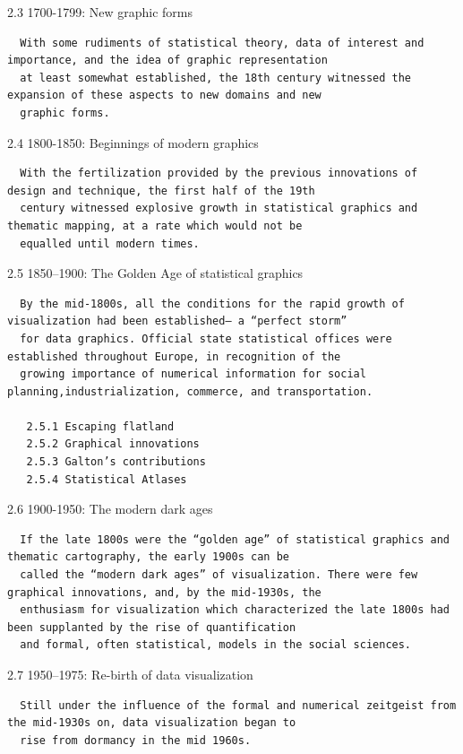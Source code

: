 \documentclass[]{book}
\theoremstyle{definition}
\theoremstyle{definition}
\theoremstyle{definition}
\theoremstyle{remark}
\begin{document}
\begin{enumerate}
  2.3 1700-1799: New graphic forms

\begin{verbatim}
  With some rudiments of statistical theory, data of interest and importance, and the idea of graphic representation
  at least somewhat established, the 18th century witnessed the expansion of these aspects to new domains and new
  graphic forms. 
\end{verbatim}

  2.4 1800-1850: Beginnings of modern graphics

\begin{verbatim}
  With the fertilization provided by the previous innovations of design and technique, the first half of the 19th
  century witnessed explosive growth in statistical graphics and thematic mapping, at a rate which would not be
  equalled until modern times.
\end{verbatim}

  2.5 1850--1900: The Golden Age of statistical graphics

\begin{verbatim}
  By the mid-1800s, all the conditions for the rapid growth of visualization had been established— a “perfect storm”
  for data graphics. Official state statistical offices were established throughout Europe, in recognition of the
  growing importance of numerical information for social planning,industrialization, commerce, and transportation. 

   2.5.1 Escaping flatland
   2.5.2 Graphical innovations
   2.5.3 Galton’s contributions
   2.5.4 Statistical Atlases
\end{verbatim}

  2.6 1900-1950: The modern dark ages

\begin{verbatim}
  If the late 1800s were the “golden age” of statistical graphics and thematic cartography, the early 1900s can be
  called the “modern dark ages” of visualization. There were few graphical innovations, and, by the mid-1930s, the
  enthusiasm for visualization which characterized the late 1800s had been supplanted by the rise of quantification
  and formal, often statistical, models in the social sciences.
\end{verbatim}

  2.7 1950--1975: Re-birth of data visualization

\begin{verbatim}
  Still under the influence of the formal and numerical zeitgeist from the mid-1930s on, data visualization began to
  rise from dormancy in the mid 1960s. 
\end{verbatim}


\end{enumerate}
\end{document}
